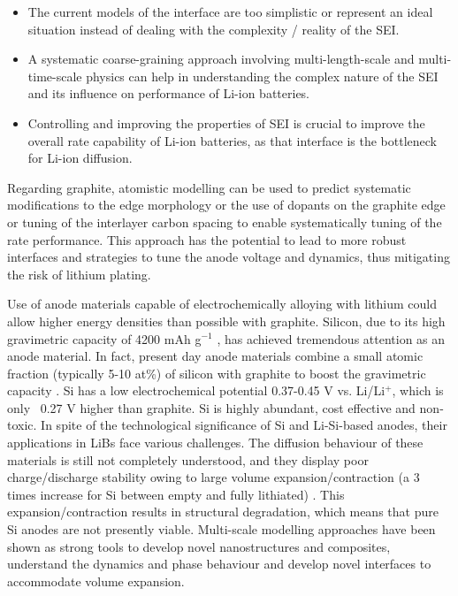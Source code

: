 \documentclass[../main.tex]{subfiles}
\begin{document}
    \begin{itemize}
        \item The current models of the interface are too simplistic or represent an ideal situation instead of dealing with the complexity / reality of the SEI.
        \item A systematic coarse-graining approach involving multi-length-scale and multi-time-scale physics can help in understanding the complex nature of the SEI and its influence on performance of Li-ion batteries.
        \item Controlling and improving the properties of SEI is crucial to improve the overall rate capability of Li-ion batteries, as that interface is the bottleneck for Li-ion diffusion.
    \end{itemize}

Regarding graphite, atomistic modelling can be used to predict systematic modifications to the edge morphology or the use of dopants on the graphite edge \cite{peng2020lithium,weydanz1994behavior,way1994effect} or tuning of the interlayer carbon spacing \cite{JI201866} to enable systematically tuning of the rate performance. This approach has the potential to lead to more robust interfaces and strategies to tune the anode voltage and dynamics, thus mitigating the risk of lithium plating.

Use of anode materials capable of electrochemically alloying with lithium could allow higher energy densities than possible with graphite. Silicon, due to its high gravimetric capacity of 4200 mAh g$^{-1}$ , has achieved tremendous attention as an anode material. \cite{larcher2007recent} In fact, present day anode materials combine a small atomic fraction (typically 5-10 at\%) of silicon with graphite to boost the gravimetric capacity \cite{asenbauer_success_2020}. Si has a low electrochemical potential 0.37-0.45 V vs. Li/Li$^+$, which is only ~0.27 V higher than graphite. \cite{feng-Small-2018}  Si is highly abundant, cost effective and non-toxic. \cite{nitta2014high, feng-Small-2018,Wagner-JPS-2019} In spite of the technological significance of Si and Li-Si-based anodes, their applications in LiBs face various challenges. The diffusion behaviour of these materials is still not completely understood, and they display poor charge/discharge stability owing to large volume expansion/contraction (a 3 times increase for Si between empty and fully lithiated) \cite{Wang-JPS-2014,Wagner-JPS-2019,feng-Small-2018}. This expansion/contraction results in structural degradation, which means that pure Si anodes are not presently viable. Multi-scale modelling approaches have been shown as strong tools to develop novel nanostructures and composites, understand the dynamics and phase behaviour and develop novel interfaces to accommodate volume expansion.\cite{feng-Small-2018}  
\end{document}
